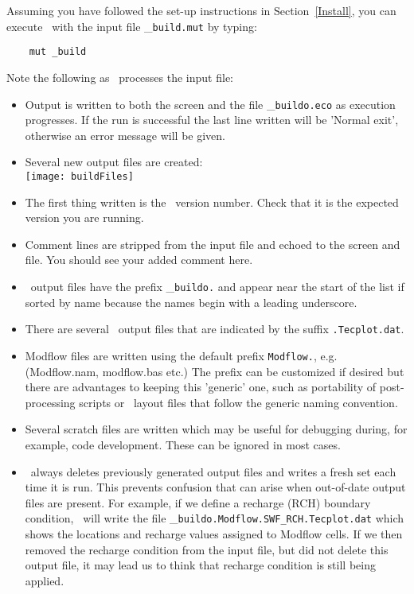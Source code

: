 Assuming you have followed the set-up instructions in Section~\ref{Install}, you can execute \mut\ with the input file \_\verb+build.mut+ by typing:
\begin{verbatim}
    mut _build
\end{verbatim}

Note the following as \mut\ processes the input file:
\begin{itemize}
    \item Output is written to both the screen and the file \_\verb+buildo.eco+ as execution progresses.  If the run is successful the last line written will be 'Normal exit', otherwise an error message will be given.
    \item  Several new output files are created: \\
        \texttt{[image: buildFiles]} \\
    \item  The first thing written is the \mut\ version number.  Check that it is the expected version you are running.
    \item  Comment lines are stripped from the input file and echoed to the screen and file.  You should see your added comment here.
    \item \mut\ output files have the prefix \_\verb+buildo.+ and appear near the start of the list if sorted by name because the names begin with a leading underscore.
    \item There are several \tecplot\ output files that are indicated by the suffix \verb+.Tecplot.dat+.
    \item Modflow files are written using the default prefix \verb+Modflow.+, e.g. (Modflow.nam, modflow.bas etc.)  The prefix can be customized if desired but there are advantages to keeping this 'generic' one, such as portability of post-processing scripts or \tecplot\ layout files that follow the generic naming convention.
    \item Several scratch files are written which may be useful for debugging during, for example, code development.  These can be ignored in most cases.
    \item \mut\ always deletes previously generated output files and writes a fresh set each time it is run.  This prevents confusion that can arise when out-of-date output files are present.  For example, if we define a recharge (RCH) boundary condition, \mut\ will write the file \_\verb+buildo.Modflow.SWF_RCH.Tecplot.dat+ which shows the locations and recharge values assigned to Modflow cells.  If we then removed the recharge condition from the input file, but did not delete this output file, it may lead us to think that recharge condition is still being applied.
\end{itemize}


